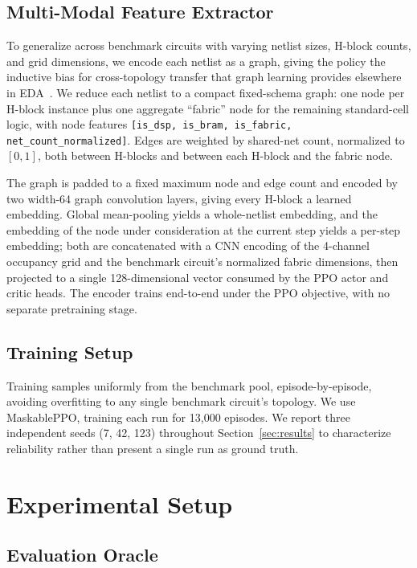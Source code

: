 \documentclass[sigconf]{acmart}
\begin{document}
\subsection{Multi-Modal Feature Extractor}
\label{sec:gnn}

To generalize across benchmark circuits with varying netlist sizes, H-block counts,
and grid dimensions, we encode each netlist as a graph, giving the policy the
inductive bias for cross-topology transfer that graph learning provides
elsewhere in EDA~\cite{gamora}. We reduce each netlist to a compact
fixed-schema graph: one node per H-block instance plus one aggregate
``fabric'' node for the remaining standard-cell logic, with node features
\texttt{[is\_dsp, is\_bram, is\_fabric, net\_count\_normalized]}. Edges are
weighted by shared-net count, normalized to $[0,1]$, both between
H-blocks and between each H-block and the fabric node.

The graph is padded to a fixed maximum node and edge count
 and encoded by two width-64 graph convolution
layers, giving every H-block a learned embedding. Global mean-pooling
yields a whole-netlist embedding, and the embedding of the node under
consideration at the current step yields a per-step embedding; both are
concatenated with a CNN encoding of the 4-channel occupancy grid and the
benchmark circuit's normalized fabric dimensions, then projected to a single
128-dimensional vector consumed by the PPO actor and critic heads. The
encoder trains end-to-end under the PPO objective, with no separate
pretraining stage.


\subsection{Training Setup}
\label{sec:training}

Training samples uniformly from the benchmark pool, episode-by-episode,
avoiding overfitting to any single benchmark circuit's topology. We use
MaskablePPO, training each run for 13,000 episodes. We report three
independent seeds (7, 42, 123) throughout Section~\ref{sec:results} to
characterize reliability rather than present a single run as ground truth.

\section{Experimental Setup}
\label{sec:setup}

\subsection{Evaluation Oracle}
\label{sec:oracle}
\end{document}
